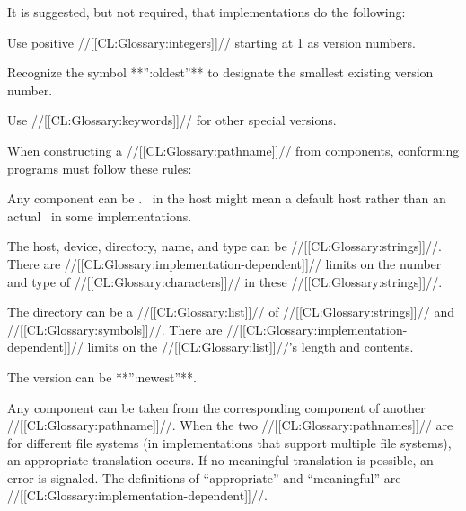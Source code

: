 
It is suggested, but not required, that implementations do the following:

\beginlist

\itemitem{\bull} Use positive //[[CL:Glossary:integers]]// starting at 1 as version numbers.

\itemitem{\bull} Recognize the symbol **'':oldest''**
		 to designate the smallest existing version number.

\itemitem{\bull} Use //[[CL:Glossary:keywords]]// for other special versions.

\endlist

\endsubsubsubsection%


  When constructing a //[[CL:Glossary:pathname]]// from components, conforming programs
  must follow these rules:
  
\beginlist

\itemitem{\bull}
  Any component can be \nil.
  \nil\ in the host might mean a default host 
  rather than an actual \nil\ in some implementations.
           
\itemitem{\bull}

  The host, device, directory, name, and type can be //[[CL:Glossary:strings]]//.  There
  are //[[CL:Glossary:implementation-dependent]]// limits on the number and type of
  //[[CL:Glossary:characters]]// in these //[[CL:Glossary:strings]]//.
  
\itemitem{\bull}
  The directory can be a //[[CL:Glossary:list]]// of //[[CL:Glossary:strings]]// and //[[CL:Glossary:symbols]]//.
  There are //[[CL:Glossary:implementation-dependent]]// limits on the //[[CL:Glossary:list]]//'s
  length and contents.
  
\itemitem{\bull}
  The version can be **'':newest''**.
 
\itemitem{\bull}
  Any component can be taken 
  from the corresponding component of another //[[CL:Glossary:pathname]]//.
  When the two //[[CL:Glossary:pathnames]]// are for different file systems
    (in implementations that support multiple file systems),
  an appropriate translation occurs.
  If no meaningful translation is possible,
  an error is signaled.
  The definitions of ``appropriate'' and ``meaningful'' 
  are //[[CL:Glossary:implementation-dependent]]//.
  
